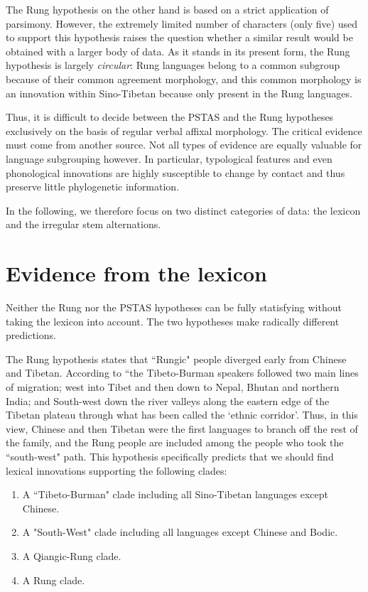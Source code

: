 \documentclass[oldfontcommands,oneside,a4paper,11pt]{article}
\begin{document}
The Rung hypothesis  on the other hand is based on a strict application of parsimony. However, the extremely limited number of characters (only five) used to support this hypothesis raises the question whether a similar result would be obtained with a larger body of data. As it stands in its present form, the Rung hypothesis is largely \textit{circular}: Rung languages belong to a common subgroup because of their common agreement morphology, and this common morphology is an innovation within Sino-Tibetan because only present in the Rung languages. 

Thus, it is difficult to decide between  the PSTAS and the Rung hypotheses exclusively on the basis of regular verbal affixal morphology. The critical evidence must come from another source. Not all types of evidence are equally valuable for language subgrouping however. In particular, typological features and even phonological innovations are highly susceptible to change by contact and thus preserve little phylogenetic information.

In  the following, we therefore focus on two distinct categories of data: the lexicon and the   irregular stem alternations.
 

\section{Evidence from the lexicon}
Neither the Rung   nor the PSTAS hypotheses can be fully statisfying without taking the lexicon into account. The two hypotheses make radically different predictions. 

The Rung hypothesis states that ``Rungic" people diverged early from Chinese and Tibetan. According to \citet[236]{lapolla01migration}  ``the Tibeto-Burman speakers followed two main lines of migration; west into Tibet and then down to Nepal, Bhutan and northern India; and South-west down the river valleys along the eastern edge of the Tibetan plateau through what has been called the `ethnic corridor'. Thus, in this view, Chinese and then Tibetan were the first languages to branch off the rest of the family, and the Rung people are included among the people who took the ``south-west" path. This hypothesis specifically predicts that we should find lexical innovations supporting the following clades:

\begin{enumerate}
\item  A ``Tibeto-Burman" clade including all Sino-Tibetan languages except Chinese.
\item A "South-West" clade including all languages except Chinese and Bodic.
\item A Qiangic-Rung clade.
\item A Rung clade.
\end{enumerate}
\end{document}
